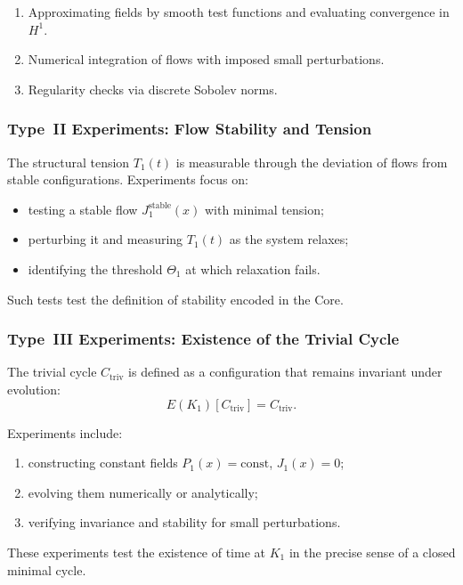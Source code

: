 \begin{enumerate}
    \item Approximating fields by smooth test functions and evaluating
          convergence in $H^1$.
    \item Numerical integration of flows with imposed small perturbations.
    \item Regularity checks via discrete Sobolev norms.
\end{enumerate}


\subsubsection{Type~II Experiments: Flow Stability and Tension}

The structural tension $T_1(t)$ is measurable through the deviation of flows
from stable configurations.
Experiments focus on:

\begin{itemize}
    \item testing a stable flow $J_1^{\mathrm{stable}}(x)$ with minimal tension;
    \item perturbing it and measuring $T_1(t)$ as the system relaxes;
    \item identifying the threshold $\Theta_1$ at which relaxation fails.
\end{itemize}

Such tests test the definition of stability encoded in the Core.


\subsubsection{Type~III Experiments: Existence of the Trivial Cycle}

The trivial cycle $C_{\mathrm{triv}}$ is defined as a configuration that
remains invariant under evolution:
\[
    E(K_1)[C_{\mathrm{triv}}] = C_{\mathrm{triv}}.
\]

Experiments include:

\begin{enumerate}
    \item constructing constant fields $P_1(x)=\mathrm{const}$,
          $J_1(x)=0$;
    \item evolving them numerically or analytically;
    \item verifying invariance and stability for small perturbations.
\end{enumerate}

These experiments test the existence of time at $K_1$ in the precise
sense of a closed minimal cycle.


